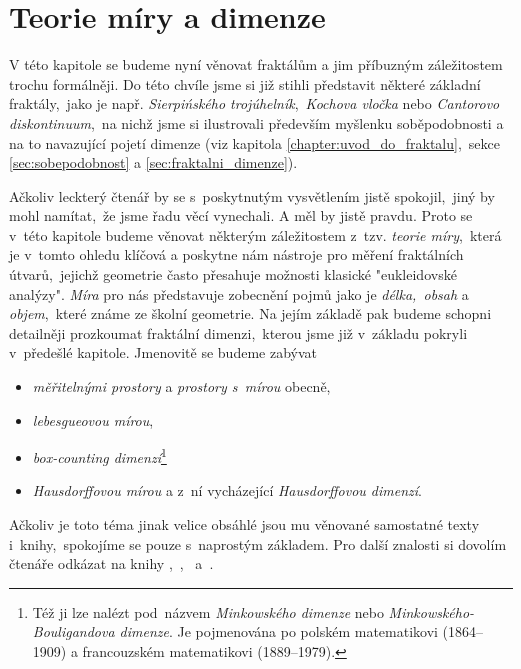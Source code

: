 \chapter{Teorie míry a dimenze}\label{chapter:teorie-miry-a-dimenze}

V této kapitole se budeme nyní věnovat fraktálům a jim příbuzným záležitostem trochu formálněji. Do této chvíle jsme si již stihli představit některé základní fraktály,~jako je např. \emph{Sierpińského trojúhelník},~\emph{Kochova vločka} nebo \emph{Cantorovo diskontinuum},~na nichž jsme si ilustrovali především myšlenku soběpodobnosti a na to navazující pojetí dimenze (viz kapitola \ref{chapter:uvod_do_fraktalu},~sekce \ref{sec:sobepodobnost} a \ref{sec:fraktalni_dimenze}).

Ačkoliv leckterý čtenář by se s~poskytnutým vysvětlením jistě spokojil,~jiný by mohl namítat,~že jsme řadu věcí vynechali. A měl by jistě pravdu. Proto se v~této kapitole budeme věnovat některým záležitostem z~tzv. \emph{teorie míry},~která je v~tomto ohledu klíčová a poskytne nám nástroje pro měření fraktálních útvarů,~jejichž geometrie často přesahuje možnosti klasické "eukleidovské analýzy". \emph{Míra} pro nás představuje zobecnění pojmů jako je \emph{délka,~obsah} a \emph{objem},~které známe ze školní geometrie. Na jejím základě pak budeme schopni detailněji prozkoumat fraktální dimenzi,~kterou jsme již v~základu pokryli v~předešlé kapitole. Jmenovitě se budeme zabývat
\begin{itemize}
    \item \emph{měřitelnými prostory} a \emph{prostory s~mírou} obecně,
    \item \emph{lebesgueovou mírou},
    \item \emph{box-counting dimenzí}\footnote{Též ji lze nalézt pod~názvem \emph{Minkowského dimenze} nebo \emph{Minkowského-Bouligandova dimenze}. Je pojmenována po polském matematikovi  (1864--1909) a francouzském matematikovi  (1889--1979).}
    \item \emph{Hausdorffovou mírou} a z~ní vycházející \emph{Hausdorffovou dimenzí}.
\end{itemize}

Ačkoliv je toto téma jinak velice obsáhlé jsou mu věnované samostatné texty i~knihy,~spokojíme se pouze s~naprostým základem. Pro další znalosti si dovolím čtenáře odkázat na knihy \cite{Falconer2014},~\cite{Lukes2013},~\cite{Netuka2016} a~\cite{Edgar2008}.

